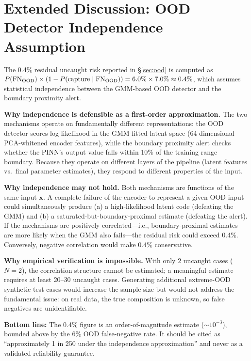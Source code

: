 \documentclass[usenatbib]{mnras}
\begin{document}
\section{Extended Discussion: OOD Detector Independence Assumption}\label{app:independence}

The 0.4\% residual uncaught risk reported in \S\ref{sec:ood} is computed as $P(\text{FN}_{\rm OOD}) \times (1 - P(\text{capture} \mid \text{FN}_{\rm OOD})) = 6.0\% \times 7.0\% \approx 0.4\%$, which assumes statistical independence between the GMM-based OOD detector and the boundary proximity alert.

\textbf{Why independence is defensible as a first-order approximation.} The two mechanisms operate on fundamentally different representations: the OOD detector scores log-likelihood in the GMM-fitted latent space (64-dimensional PCA-whitened encoder features), while the boundary proximity alert checks whether the PINN's output value falls within 10\% of the training range boundary. Because they operate on different layers of the pipeline (latent features vs.\ final parameter estimates), they respond to different properties of the input.

\textbf{Why independence may not hold.} Both mechanisms are functions of the same input $\mathbf{x}$. A complete failure of the encoder to represent a given OOD input could simultaneously produce (a) a high-likelihood latent code (defeating the GMM) and (b) a saturated-but-boundary-proximal estimate (defeating the alert). If the mechanisms are positively correlated---i.e., boundary-proximal estimates are more likely when the GMM also fails---the residual risk could exceed 0.4\%. Conversely, negative correlation would make 0.4\% conservative.

\textbf{Why empirical verification is impossible.} With only 2 uncaught cases ($N=2$), the correlation structure cannot be estimated; a meaningful estimate requires at least 20--30 uncaught cases. Generating additional extreme-OOD synthetic test cases would increase the sample size but would not address the fundamental issue: on real data, the true composition is unknown, so false negatives are unidentifiable.

\textbf{Bottom line:} The 0.4\% figure is an order-of-magnitude estimate ($\sim 10^{-3}$), bounded above by the 6\% OOD false-negative rate. It should be cited as ``approximately 1 in 250 under the independence approximation'' and never as a validated reliability guarantee.
\end{document}
